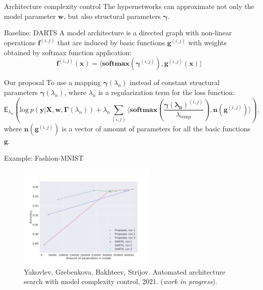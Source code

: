 \documentclass[usenames,dvipsnames,11pt,pdf,utf8,russian,aspectratio=169]{beamer}
\begin{document}
\begin{frame}{Architecture complexity control}
\footnotesize
The hypernetworks can approximate not only the model parameter $\mathbf{w}$, but also structural parameters $\boldsymbol{\gamma}$.
\begin{block}{Baseline: DARTS}
A model architecture is a directed graph with non-linear operations $\mathbf{f}^{(i, j)}$ that are induced by basic functions $\mathbf{g}^{(i, j)}$ with weights obtained by softmax function application:
\[
\mathbf{f}^{(i, j)}(\mathbf{x}) = \langle \textbf{softmax}(\boldsymbol{\gamma}^{(i, j)}), {\mathbf{g}}^{(i,j)}(\mathbf{x})\rangle
\]
\end{block}

\begin{block}{Our proposal}
To use a mapping $\boldsymbol{\gamma}(\lambda_n)$ instead of constant structural parameters $\boldsymbol{\gamma}(\lambda_n)$, where $\lambda_n$ is a regularization term for the loss function:
\[
    \mathsf{E}_{\lambda_n} \left( \text{log}~p(\mathbf{y} | \mathbf{X}, \mathbf{w}, \boldsymbol{\Gamma}(\lambda_n))  +  \lambda_n \sum_{(i,j)}    \langle \textbf{softmax}\left( \frac{\boldsymbol{\gamma(\lambda_n)}^{(i, j)}}{\lambda_\text{temp}} \right), \mathbf{n}({\mathbf{g}}^{(i,j)})\rangle  \right),   
\]
where $\mathbf{n}({\mathbf{g}}^{(i,j)})$ is a vector of amount of parameters for all the basic functions $\mathbf{g}$.
\end{block}

\end{frame}


\begin{frame}{Example: Fashion-MNIST}
\begin{figure}[h]
\includegraphics[width=0.6\textwidth]{./darts.pdf}
\caption*{\footnotesize Yakovlev, Grebenkova, Bakhteev, Strijov. Automated architecture search with model complexity control, 2021. (\textit{work in progress}).}
\end{figure}
\end{frame}
\end{document}
